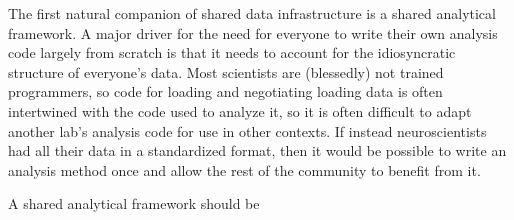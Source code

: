 \documentclass{article}
\begin{document}
The first natural companion of shared data infrastructure is a shared
analytical framework. A major driver for the need for everyone to write
their own analysis code largely from scratch is that it needs to account
for the idiosyncratic structure of everyone's data. Most scientists are
(blessedly) not trained programmers, so code for loading and negotiating
loading data is often intertwined with the code used to analyze it, so
it is often difficult to adapt another lab's analysis code for use in
other contexts. If instead neuroscientists had all their data in a
standardized format, then it would be possible to write an analysis
method once and allow the rest of the community to benefit from it.

A shared analytical framework should be

\begin{itemize}


\end{itemize}
\end{document}
